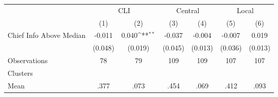 {
\def\sym#1{\ifmmode^{#1}\else\(^{#1}\)\fi}
\begin{tabular}{l*{6}{c}}
\hline\hline
                &\multicolumn{2}{c}{CLI}              &\multicolumn{2}{c}{Central}          &\multicolumn{2}{c}{Local}            \\
                &\multicolumn{1}{c}{(1)}         &\multicolumn{1}{c}{(2)}         &\multicolumn{1}{c}{(3)}         &\multicolumn{1}{c}{(4)}         &\multicolumn{1}{c}{(5)}         &\multicolumn{1}{c}{(6)}         \\
\hline
Chief Info Above Median&   -0.011         &    0.040\sym{**} &   -0.037         &   -0.004         &   -0.007         &    0.019         \\
                &  (0.048)         &  (0.019)         &  (0.045)         &  (0.013)         &  (0.036)         &  (0.013)         \\
\hline
Observations    &       78         &       79         &      109         &      109         &      107         &      107         \\
Clusters        &                  &                  &                  &                  &                  &                  \\
Mean            &     .377         &     .073         &     .454         &     .069         &     .412         &     .093         \\
\hline\hline
\end{tabular}
}
